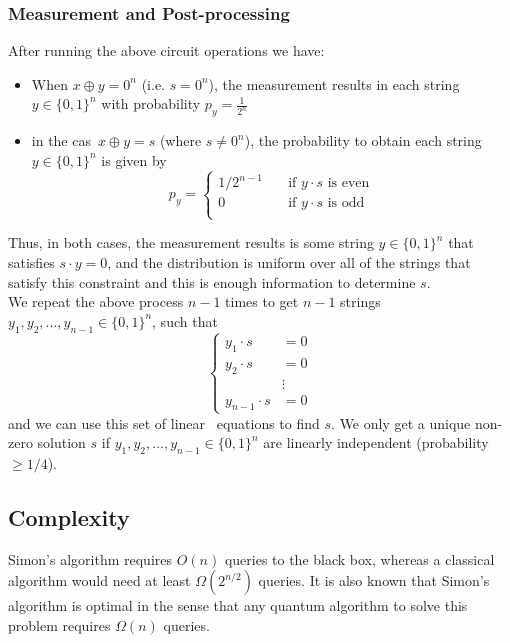\documentclass[11.5pt, paper=a4]{article}
\theoremstyle{definition}
\numberwithin{theorem}{section}
\begin{document}
\subsubsection{Measurement and Post-processing}
After running the above circuit operations we have: 
\begin{itemize}
    \item When $x \oplus y = 0^n $ (i.e. $s=0^n$), the measurement results in each string $y \in \{ 0, 1\}^n$ with probability $p_y = \frac{1}{ 2^n }$
    \item in the cas\ $x \oplus y = s $ (where $s \neq 0^n$), the probability to obtain each string $y \in \{ 0, 1\}^n$ is given by
    $$p_y =
    \begin{cases}
    {1/2^{n-1}} &\quad \text{if } y \cdot s \text{ is even}\\
    0 &\quad \text{if } y \cdot s \text{ is odd}\\
    \end{cases}$$
\end{itemize}
Thus, in both cases, the measurement results is some string $y \in \{ 0, 1\}^n$ that satisfies $s \cdot y = 0$, and the distribution is uniform over all of the strings that satisfy this constraint and this is enough information to determine $s$.\\[2mm]
We repeat the above process $n - 1$ times to get $n - 1$ strings $y_1, y_2, \dots, y_{n-1} \in \{ 0, 1\}^n$, such that
$$
\begin{cases}
y_1 \cdot s &= 0 \\
y_2 \cdot s &= 0 \\
&\vdots \\
y_{n-1} \cdot s &= 0
\end{cases}
$$
and we can use this set of linear \
equations to find $s$. We only get a unique non-zero solution $s$ if $y_1, y_2, 
\dots, y_{n-1} \in \{ 0, 1\}^n$ are linearly independent (probability $\geq 1/4$).

\subsection{Complexity}
Simon's algorithm requires $O(n)$ queries to the black box, whereas a classical algorithm would need at least $\Omega (2^{n/2})$ queries. It is also known that Simon's algorithm is optimal in the sense that any quantum algorithm to solve this problem requires $\Omega (n)$ queries.
\nocite{*}



\end{document}
